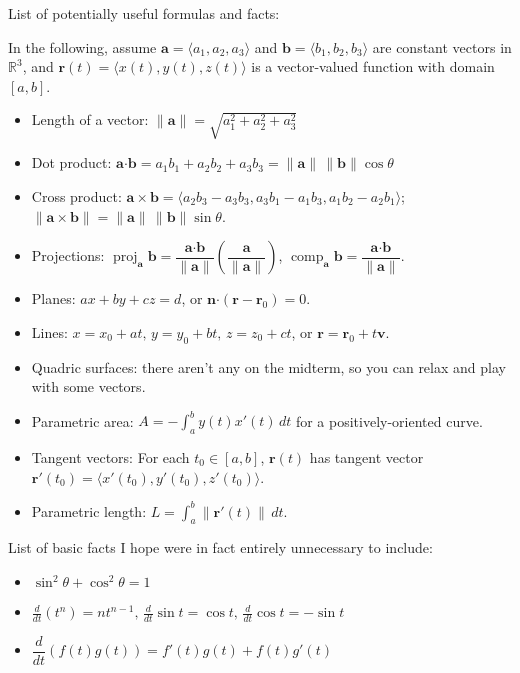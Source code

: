 \documentclass[12pt]{article}
\newcommand{\R}{\mathbb{R}}
\newcommand{\aaa}{\mathbf{a}}
\newcommand{\bbb}{\mathbf{b}}
\newcommand{\dotp}{\boldsymbol{\cdot}}
\begin{document}
\begin{center}
List of potentially useful formulas and facts:
\end{center}

In the following, assume $\aaa = \langle a_1,a_2,a_3\rangle$ and $\bbb = \langle b_1,b_2,b_3\rangle$ are constant vectors in $\R^3$, and $\mathbf{r}(t) = \langle x(t),y(t),z(t)\rangle$ is a vector-valued function with domain $[a,b]$.
\begin{itemize}
\item Length of a vector: $\lVert\aaa\rVert = \sqrt{a_1^2+a_2^2+a_3^2}$
\item Dot product: $\aaa\dotp\bbb = a_1b_1+a_2b_2+a_3b_3 = \lVert\aaa\rVert\,\lVert\bbb\rVert\cos\theta$
\item Cross product: $\aaa\times\bbb = \langle a_2b_3-a_3b_3,a_3b_1-a_1b_3,a_1b_2-a_2b_1\rangle$; $\lVert \aaa\times\bbb\rVert = \lVert\aaa\rVert\,\lVert\bbb\rVert\sin\theta$.
\item Projections: $\operatorname{proj}_\aaa\bbb = \dfrac{\aaa\dotp\bbb}{\lVert\aaa\rVert}\left(\dfrac{\aaa}{\lVert\aaa\rVert}\right)$, $\operatorname{comp}_\aaa\bbb = \dfrac{\aaa\dotp\bbb}{\lVert\aaa\rVert}$.
\item Planes: $ax+by+cz=d$, or $\mathbf{n}\dotp(\mathbf{r}-\mathbf{r}_0)=0$.
\item Lines: $x=x_0+at,\, y=y_0+bt,\, z=z_0+ct$, or $\mathbf{r} = \mathbf{r}_0+t\mathbf{v}$.
\item Quadric surfaces: there aren't any on the midterm, so you can relax and play with some vectors.
\item Parametric area: $\displaystyle A = -\int_a^b y(t)x'(t)\, dt$ for a positively-oriented curve.
\item Tangent vectors: For each $t_0\in [a,b]$, $\mathbf{r}(t)$ has tangent vector $\mathbf{r}'(t_0) = \langle x'(t_0),y'(t_0),z'(t_0)\rangle$.
\item Parametric length: $\displaystyle L = \int_a^b\lVert\mathbf{r}'(t)\rVert\,dt$.
\end{itemize}
\begin{center}
List of basic facts I hope were in fact entirely unnecessary to include:
\end{center}
\begin{itemize}
\item $\sin^2\theta+\cos^2\theta = 1$
\item $\displaystyle \frac{d}{dt}(t^n) = nt^{n-1},\, \frac{d}{dt}\sin t = \cos t,\, \frac{d}{dt}\cos t = -\sin t$
\item $\dfrac{d}{dt}(f(t)g(t)) = f'(t)g(t)+f(t)g'(t)$
\end{itemize}
\end{document}
